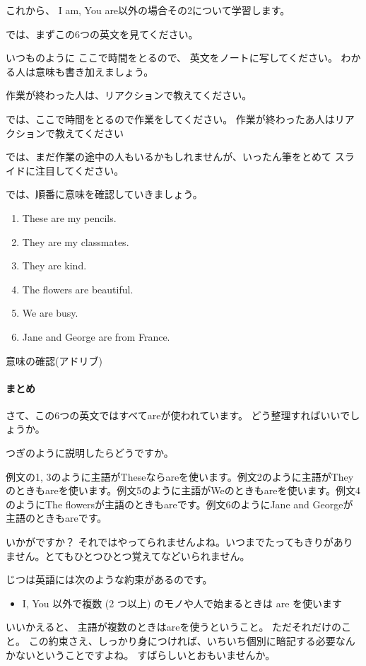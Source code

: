 \documentclass[book,jafontscale=0.9247]{jlreq}
\newcommand{\mySagyo}{%
\par%
\bigskip
では、ここで時間をとるので作業をしてください。
作業が終わったあ人はリアクションで教えてください\par%
\begin{minipage}[t]{.98\textwidth}
\mbox{}\hrulefill\mbox{}\par%
\mbox{}\hfill{}\raisebox{-.5\height}{作業}\hfill\mbox{}\par%
\mbox{}\hrulefill\mbox{}
\end{minipage}%
\par%
\bigskip%
では、まだ作業の途中の人もいるかもしれませんが、いったん筆をとめて
スライドに注目してください。%
\par%
\bigskip
}
\newcommand{\myMouse}{%
  {\large \ComputerMouse}
}
\begin{document}
これから、
I am, You are以外の場合その2について学習します。%


では、まずこの6つの英文を見てください。

いつものように
ここで時間をとるので、
英文をノートに写してください。
わかる人は意味も書き加えましょう。

作業が終わった人は、リアクションで教えてください。

\mySagyo

では、順番に意味を確認していきましょう。

\begin{enumerate}
 \item These are my pencils.
 \item They are my classmates.
 \item They are kind.
 \item The flowers are beautiful.
 \item We are busy.
 \item Jane and George are from France.
\end{enumerate}

意味の確認(アドリブ)

\paragraph{まとめ}

さて、この6つの英文ではすべてareが使われています。
どう整理すればいいでしょうか。

つぎのように説明したらどうですか。

例文の1, 3のように主語がTheseならareを使います。例文2のように主語がTheyのときもareを使います。例文5のように主語がWeのときもareを使います。例文4のようにThe flowersが主語のときもareです。例文6のようにJane and Georgeが主語のときもareです。

いかがですか？
それではやってられませんよね。いつまでたってもきりがありません。とてもひとつひとつ覚えてなどいられません。

じつは英語には次のような約束があるのです。

\myMouse

\begin{itemize}
 \item I, You 以外で複数 (2 つ以上) のモノや人で始まるときは are を使います
\end{itemize}

いいかえると、
主語が複数のときはareを使うということ。
ただそれだけのこと。
この約束さえ、しっかり身につければ、いちいち個別に暗記する必要なんかないということですよね。
すばらしいとおもいませんか。
\end{document}
